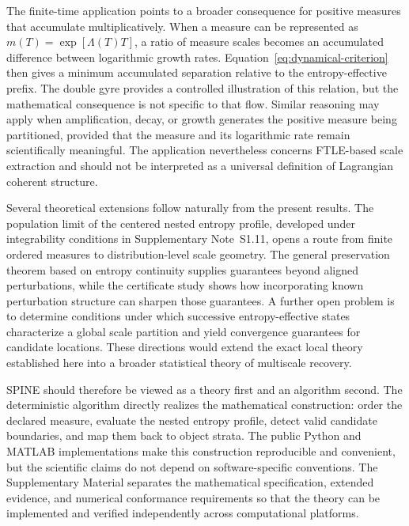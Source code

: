\documentclass[aip,cha,reprint,superscriptaddress,floatfix]{revtex4-2}
\theoremstyle{definition}
\theoremstyle{remark}
\begin{document}
The finite-time application points to a broader consequence for positive measures that accumulate multiplicatively. When a measure can be represented as \(m(T)=\exp[\Lambda(T)T]\), a ratio of measure scales becomes an accumulated difference between logarithmic growth rates. Equation~\eqref{eq:dynamical-criterion} then gives a minimum accumulated separation relative to the entropy-effective prefix. The double gyre provides a controlled illustration of this relation, but the mathematical consequence is not specific to that flow. Similar reasoning may apply when amplification, decay, or growth generates the positive measure being partitioned, provided that the measure and its logarithmic rate remain scientifically meaningful. The application nevertheless concerns FTLE-based scale extraction and should not be interpreted as a universal definition of Lagrangian coherent structure.

Several theoretical extensions follow naturally from the present results. The population limit of the centered nested entropy profile, developed under integrability conditions in Supplementary Note~S1.11, opens a route from finite ordered measures to distribution-level scale geometry. The general preservation theorem based on entropy continuity supplies guarantees beyond aligned perturbations, while the certificate study shows how incorporating known perturbation structure can sharpen those guarantees. A further open problem is to determine conditions under which successive entropy-effective states characterize a global scale partition and yield convergence guarantees for candidate locations. These directions would extend the exact local theory established here into a broader statistical theory of multiscale recovery.

SPINE should therefore be viewed as a theory first and an algorithm second. The deterministic algorithm directly realizes the mathematical construction: order the declared measure, evaluate the nested entropy profile, detect valid candidate boundaries, and map them back to object strata. The public Python and MATLAB implementations make this construction reproducible and convenient, but the scientific claims do not depend on software-specific conventions. The Supplementary Material separates the mathematical specification, extended evidence, and numerical conformance requirements so that the theory can be implemented and verified independently across computational platforms.
\end{document}
